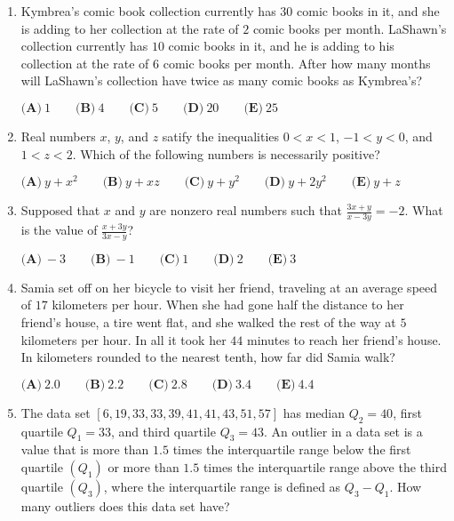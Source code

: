 \documentclass{article}
\begin{document}
\begin{enumerate}[label=\arabic*., itemsep=0.5em]
\item Kymbrea's comic book collection currently has \(30\) comic books in it, and she is adding to her collection at the rate of \(2\) comic books per month. LaShawn's collection currently has \(10\) comic books in it, and he is adding to his collection at the rate of \(6\) comic books per month. After how many months will LaShawn's collection have twice as many comic books as Kymbrea's?

\(\textbf{(A)}\ 1\qquad\textbf{(B)}\ 4\qquad\textbf{(C)}\ 5\qquad\textbf{(D)}\ 20\qquad\textbf{(E)}\ 25\)\par \vspace{0.5em}\item Real numbers \(x\), \(y\), and \(z\) satify the inequalities
\(0<x<1\), \(-1<y<0\), and \(1<z<2\).
Which of the following numbers is necessarily positive?

\(\textbf{(A)}\ y+x^2\qquad\textbf{(B)}\ y+xz\qquad\textbf{(C)}\ y+y^2\qquad\textbf{(D)}\ y+2y^2\qquad\textbf{(E)}\ y+z\)\par \vspace{0.5em}\item Supposed that \(x\) and \(y\) are nonzero real numbers such that \(\frac{3x+y}{x-3y}=-2\). What is the value of \(\frac{x+3y}{3x-y}\)?

\(\textbf{(A)}\ -3\qquad\textbf{(B)}\ -1\qquad\textbf{(C)}\ 1\qquad\textbf{(D)}\ 2\qquad\textbf{(E)}\ 3\)\par \vspace{0.5em}\item Samia set off on her bicycle to visit her friend, traveling at an average speed of \(17\) kilometers per hour. When she had gone half the distance to her friend's house, a tire went flat, and she walked the rest of the way at \(5\) kilometers per hour. In all it took her \(44\) minutes to reach her friend's house. In kilometers rounded to the nearest tenth, how far did Samia walk?

\(\textbf{(A)}\ 2.0\qquad\textbf{(B)}\ 2.2\qquad\textbf{(C)}\ 2.8\qquad\textbf{(D)}\ 3.4\qquad\textbf{(E)}\ 4.4\)\par \vspace{0.5em}\item The data set \([6,19,33,33,39,41,41,43,51,57]\) has median \(Q_2 = 40\), first quartile \(Q_1 = 33\), and third quartile \(Q_3=43\). An outlier in a data set is a value that is more than \(1.5\) times the interquartile range below the first quartile \((Q_1)\) or more than \(1.5\) times the interquartile range above the third quartile \((Q_3)\), where the interquartile range is defined as \(Q_3 - Q_1\). How many outliers does this data set have?


\end{enumerate}
\end{document}
